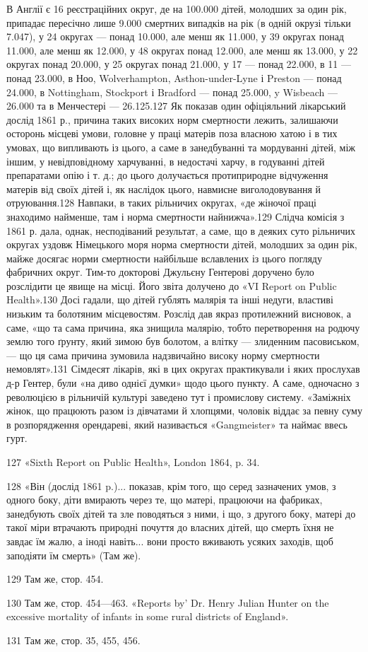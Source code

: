 В Англії є 16 реєстраційних округ, де на 100.000 дітей, молодших
за один рік, припадає пересічно лише 9.000 смертних випадків
на рік (в одній окрузі тільки 7.047), у 24 округах — понад 10.000,
але менш як 11.000, у 39 округах понад 11.000, але менш як 12.000,
у 48 округах понад 12.000, але менш як 13.000, у 22 округах
понад 20.000, у 25 округах понад 21.000, у 17 — понад 22.000,
в 11 — понад 23.000, в Ноо, Wolverhampton, Asthon-under-Lyne
і Preston — понад 24.000, в Nottingham, Stockport і Bradford —
понад 25.000, y Wisbeach — 26.000 та в Менчестері — 26.125.127
Як показав один офіціяльний лікарський дослід 1861 р., причина
таких високих норм смертности лежить, залишаючи осторонь
місцеві умови, головне у праці матерів поза власною хатою і в
тих умовах, що випливають із цього, а саме в занедбуванні та
мордуванні дітей, між іншим, у невідповідному харчуванні, в
недостачі харчу, в годуванні дітей препаратами опію і т. д.;
до цього долучається протиприродне відчуження матерів від
своїх дітей і, як наслідок цього, навмисне виголодовування й
отруювання.128 Навпаки, в таких рільничих округах, «де жіночої
праці знаходимо найменше, там і норма смертности найнижча».129
Слідча комісія з 1861 р. дала, однак, несподіваний результат,
а саме, що в деяких суто рільничих округах уздовж Німецького
моря норма смертности дітей, молодших за один рік, майже
досягає норми смертности найбільше вславлених із цього погляду
фабричних округ. Тим-то докторові Джульєну Гентерові доручено
було розслідити це явище на місці. Його звіта долучено до
«VI Report on Public Health».130 Досі гадали, що дітей гублять малярія
та інші недуги, властиві низьким та болотяним місцевостям.
Розслід дав якраз протилежний висновок, а саме, «що та сама
причина, яка знищила малярію, тобто перетворення на родючу
землю того ґрунту, який зимою був болотом, а влітку — злиденним
пасовиськом, — що ця сама причина зумовила надзвичайно
високу норму смертности немовлят».131 Сімдесят лікарів, які
в цих округах практикували і яких прослухав д-р Гентер,
були «на диво однієї думки» щодо цього пункту. А саме, одночасно
з революцією в рільничій культурі заведено тут і промислову
систему. «Заміжніх жінок, що працюють разом із дівчатами й
хлопцями, чоловік віддає за певну суму в розпорядження орендареві,
який називається «Gangmeister» та наймає ввесь гурт.

127 «Sixth Report on Public Health», London 1864, p. 34.

128 «Він (дослід 1861 p.)... показав, крім того, що серед зазначених
умов, з одного боку, діти вмирають через те, що матері, працюючи на фабриках,
занедбують своїх дітей та зле поводяться з ними, і що, з другого
боку, матері до такої міри втрачають природні почуття до власних
дітей, що смерть їхня не завдає їм жалю, а іноді навіть... вони просто вживають
усяких заходів, щоб заподіяти їм смерть» (Там же).

129 Там же, стор. 454.

130    Там же, стор. 454—463. «Reports by' Dr. Henry Julian Hunter
on the excessive mortality of infants in some rural districts of England».

131    Там же, стор. 35, 455, 456.
